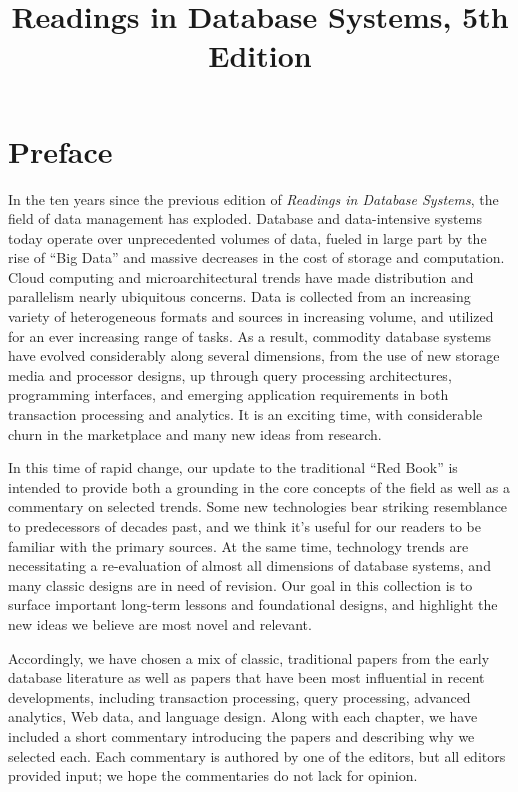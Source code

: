 \documentclass[b5paper,11pt,twoside,openright]{book}
\title{Readings in Database Systems, 5th Edition}
\author{}
\date{}
\begin{document}
\maketitle
\thispagestyle{empty}

\cleardoublepage
{}
\tableofcontents

\hypertarget{preface}{\chapter*{Preface}\label{preface}}

In the ten years since the previous edition of \emph{Readings in
Database Systems}, the field of data management has exploded. Database
and data-intensive systems today operate over unprecedented volumes of
data, fueled in large part by the rise of ``Big Data'' and massive
decreases in the cost of storage and computation. Cloud computing and
microarchitectural trends have made distribution and parallelism nearly
ubiquitous concerns. Data is collected from an increasing variety of
heterogeneous formats and sources in increasing volume, and utilized for
an ever increasing range of tasks. As a result, commodity database
systems have evolved considerably along several dimensions, from the use
of new storage media and processor designs, up through query processing
architectures, programming interfaces, and emerging application
requirements in both transaction processing and analytics. It is an
exciting time, with considerable churn in the marketplace and many new
ideas from research.

In this time of rapid change, our update to the traditional ``Red Book''
is intended to provide both a grounding in the core concepts of the
field as well as a commentary on selected trends. Some new technologies
bear striking resemblance to predecessors of decades past, and we think
it's useful for our readers to be familiar with the primary sources. At
the same time, technology trends are necessitating a re-evaluation of
almost all dimensions of database systems, and many classic designs are
in need of revision. Our goal in this collection is to surface important
long-term lessons and foundational designs, and highlight the new ideas
we believe are most novel and relevant.

Accordingly, we have chosen a mix of classic, traditional papers from
the early database literature as well as papers that have been most
influential in recent developments, including transaction processing,
query processing, advanced analytics, Web data, and language design.
Along with each chapter, we have included a short commentary introducing
the papers and describing why we selected each. Each commentary is
authored by one of the editors, but all editors provided input; we hope
the commentaries do not lack for opinion.
\end{document}
